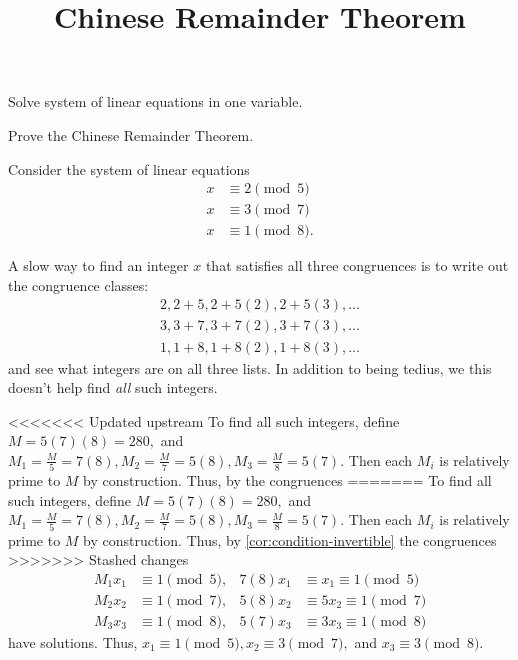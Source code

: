 \documentclass{ximera}
\title{Chinese Remainder Theorem}
\begin{document}
\begin{abstract}
\end{abstract}
\maketitle


\begin{obj}
\item Solve system of linear equations in one variable.
 \item Prove the Chinese Remainder Theorem.
\end{obj}





\begin{example}
    Consider the system of linear equations 
    \begin{align*}
        x &\equiv 2 \pmod{5}\\
        x &\equiv 3 \pmod{7}\\
        x &\equiv 1 \pmod{8}.
    \end{align*}

    A slow way to find an integer $x$ that satisfies all three congruences is to write out the congruence classes:
    \begin{align*}
        2, 2+5, 2+5(2), \boxed{2+5(3)}, \dots\\
        3, 3+7, \boxed{3+7(2)}, 3+7(3), \dots\\
        1, 1+8, 1+8(2), \boxed{1+8(3)}, \dots
    \end{align*}
    and see what integers are on all three lists. In addition to being tedius, we this doesn't help find \emph{all} such integers.

<<<<<<< Updated upstream
    To find all such integers, define $M=5(7)(8)=280,$ and $M_1=\frac{M}{5}=7(8),M_2=\frac{M}{7}=5(8),M_3=\frac{M}{8}=5(7).$ Then each $M_i$ is relatively prime to $M$ by construction. Thus, by  the congruences
=======
    To find all such integers, define $M=5(7)(8)=280,$ and $M_1=\frac{M}{5}=7(8),M_2=\frac{M}{7}=5(8),M_3=\frac{M}{8}=5(7).$ Then each $M_i$ is relatively prime to $M$ by construction. Thus, by \cref{cor:condition-invertible} the congruences
>>>>>>> Stashed changes
    \begin{align*}
        M_1x_1 & \equiv 1\pmod 5, & 7(8)x_1&\equiv x_1 \equiv 1\pmod 5\\
        M_2x_2 & \equiv 1\pmod 7, & 5(8)x_2 &\equiv 5x_2 \equiv 1\pmod 7\\
        M_3x_3 & \equiv 1\pmod 8, & 5(7)x_3&\equiv 3x_3\equiv 1\pmod 8
    \end{align*}
    have solutions. Thus, $x_1\equiv 1\pmod{5}, x_2\equiv 3\pmod{7},$ and $x_3\equiv 3\pmod{8}.$


\end{example}
\end{document}
